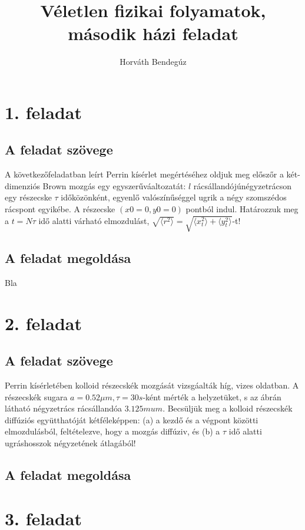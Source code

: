 \documentclass[12pt]{article}
\title{Véletlen fizikai folyamatok, második házi feladat}
\author{Horváth Bendegúz}
\begin{document}
\maketitle
\section*{1. feladat}
\subsection*{ A feladat szövege} A következőfeladatban leírt Perrin kísérlet megértéséhez oldjuk meg előszőr a két-dimenziós Brown mozgás
egy egyszerűváaltozatát: $l$ rácsállandójúnégyzetrácson egy részecske $\tau$ időközönként, egyenlő valószínűséggel ugrik a négy szomszédos rácspont egyikébe. A részecske $ (x0 = 0, y0 = 0)$ pontból indul.
Határozzuk meg a $t = N\tau $ idő alatti várható elmozdulást,  $\sqrt{\langle r^2 \rangle }= \sqrt{\langle x^2_t \rangle+ \langle y^2_t\rangle}$-t!

 
\subsection*{A feladat megoldása} Bla
 
\newpage
\section*{2. feladat}
\subsection*{ A feladat szövege}
Perrin kísérletében kolloid részecskék mozgását vizsgáalták híg, vizes oldatban. A részecskék sugara
$a = 0.52\mu m, \tau = 30s$-ként mérték a helyzetüket, s az ábrán látható négyzetrács rácsállandóa $3.125mu m$. Becsüljük meg a kolloid részecskék diffúziós együtthatóját kétféleképpen: (a) a kezdő és a végpont közötti elmozdulásból, feltételezve, hogy a mozgás diffúziv, és (b) a $\tau$ idő alatti ugráshosszok négyzetének átlagából!

 
 \subsection*{A feladat megoldása}


\newpage

\section*{3. feladat} 
\end{document}
